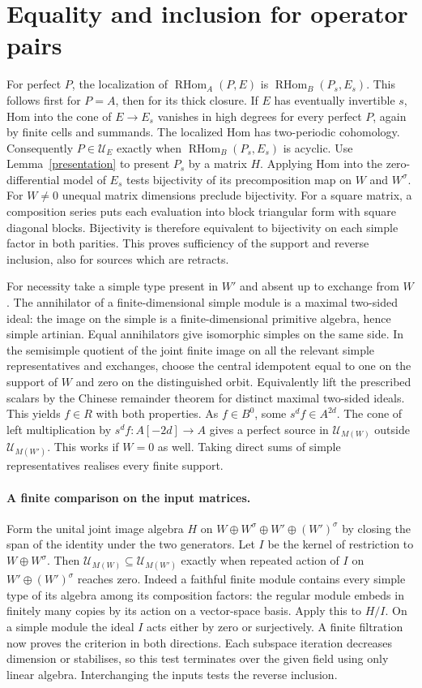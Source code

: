 \documentclass[11pt]{article}
\newcommand{\HHom}{\operatorname{RHom}}
\newcommand{\prof}{\mathcal U}
\begin{document}
\section{Equality and inclusion for operator pairs}
For perfect $P$, the localization of $\HHom_A(P,E)$ is
$\HHom_B(P_s,E_s)$. This follows first for $P=A$, then for its thick
closure. If $E$ has eventually invertible $s$, Hom into the cone of
$E\to E_s$ vanishes in high degrees for every perfect $P$, again by
finite cells and summands. The localized Hom has two-periodic cohomology.
Consequently $P\in\prof_E$ exactly when $\HHom_B(P_s,E_s)$ is acyclic.
Use Lemma~\ref{presentation} to present $P_s$ by a matrix $H$.
Applying Hom into the zero-differential model of $E_s$ tests bijectivity
of its precomposition map on $W$ and $W^\sigma$. For $W\ne0$ unequal
matrix dimensions preclude bijectivity. For a square matrix, a composition
series puts each evaluation into block triangular form with square
diagonal blocks. Bijectivity is therefore equivalent to bijectivity on
each simple factor in both parities. This proves sufficiency of the
support and reverse inclusion, also for sources which are retracts.

For necessity take a simple type present in $W'$ and absent up to exchange
from $W$. The annihilator of a finite-dimensional simple module is a
maximal two-sided ideal: the image on the simple is a finite-dimensional
primitive algebra, hence simple artinian. Equal annihilators give
isomorphic simples on the same side. In the semisimple quotient of the
joint finite image on all the relevant simple representatives and
exchanges, choose the central idempotent equal to one on the support
of $W$ and zero on the distinguished orbit. Equivalently lift the
prescribed scalars by the Chinese remainder theorem for distinct
maximal two-sided ideals. This yields $f\in R$ with both properties.
As $f\in B^0$, some $s^d f\in A^{2d}$. The cone of left multiplication
by $s^d f:A[-2d]\to A$ gives a perfect source in $\prof_{M(W)}$
outside $\prof_{M(W')}$. This works if $W=0$ as well. Taking direct sums
of simple representatives realises every finite support.

\paragraph{A finite comparison on the input matrices.}
Form the unital joint image algebra $H$ on $W\oplus W^\sigma\oplus
W'\oplus(W')^\sigma$ by closing the span of the identity under the two
generators. Let $I$ be the kernel of restriction to $W\oplus W^\sigma$.
Then $\prof_{M(W)}\subseteq\prof_{M(W')}$ exactly when repeated action
of $I$ on $W'\oplus(W')^\sigma$ reaches zero. Indeed a faithful finite
module contains every simple type of its algebra among its composition
factors: the regular module embeds in finitely many copies by its action
on a vector-space basis. Apply this to $H/I$. On a simple module the
ideal $I$ acts either by zero or surjectively. A finite filtration now
proves the criterion in both directions. Each subspace iteration
decreases dimension or stabilises, so this test terminates over the
given field using only linear algebra. Interchanging the inputs tests
the reverse inclusion.
\end{document}
